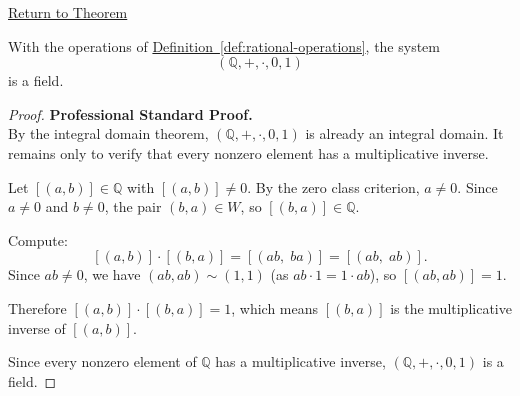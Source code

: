 \newpage
{}
\label{prf:q-is-field}

\begin{remark*}[Return]
\hyperref[thm:q-is-field]{Return to Theorem}
\end{remark*}

\begin{theorem*}
With the operations of
\hyperref[def:rational-operations]{Definition~\ref*{def:rational-operations}},
the system
\[
(\mathbb{Q},+,\cdot,0,1)
\]
is a field.
\end{theorem*}

\begin{proof}
\textbf{Professional Standard Proof.}~\\
By the integral domain theorem, $(\mathbb{Q},+,\cdot,0,1)$ is already an
integral domain. It remains only to verify that every nonzero element has a
multiplicative inverse.

Let $[(a,b)]\in\mathbb{Q}$ with $[(a,b)]\neq 0$. By the zero class
criterion, $a\neq 0$. Since $a\neq 0$ and $b\neq 0$, the pair $(b,a)\in W$,
so $[(b,a)]\in\mathbb{Q}$.

Compute:
\[
[(a,b)]\cdot[(b,a)]
= [(ab,\;ba)]
= [(ab,\;ab)].
\]
Since $ab\neq 0$, we have $(ab,ab)\sim(1,1)$ (as $ab\cdot 1 = 1\cdot ab$),
so $[(ab,ab)] = 1$.

Therefore $[(a,b)]\cdot[(b,a)] = 1$, which means $[(b,a)]$ is the
multiplicative inverse of $[(a,b)]$.

Since every nonzero element of $\mathbb{Q}$ has a multiplicative inverse,
$(\mathbb{Q},+,\cdot,0,1)$ is a field.
\end{proof}

